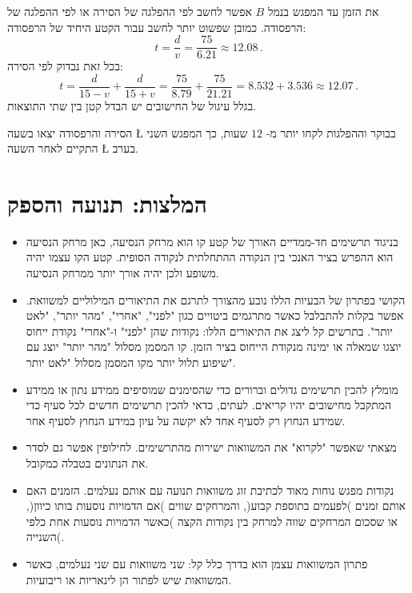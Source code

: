 \smallskip

את הזמן עד המפגש בנמל 
$B$
אפשר לחשב לפי ההפלגה של הסירה או לפי ההפלגה של הרפסודה. כמובן שפשוט יותר לחשב עבור הקטע היחיד של הרפסודה:
\[
t = \frac{d}{v} = \frac{75}{6.21} \approx 12.08\,.
\]
בכל זאת נבדוק לפי הסירה:
\[
t = \frac{d}{15-v} + \frac{d}{15+v} = \frac{75}{8.79} + \frac{75}{21.21}= 8.532 + 3.536 \approx 12.07\,.
\]
בגלל עיגול של החישובים יש הבדל קטן בין שתי התוצאות.

הסירה והרפסודה יצאו בשעה
\L{}
בבוקר וההפלגות לקחו יותר מ-%
$12$
שעות, כך המפגש השני התקיים לאחר השעה
\L{}
בערב.



\clearpage
{}


\section*{המלצות: תנועה והספק}


\begin{itemize}

\item
בניגוד תרשימים חד-ממדיים האורך של קטע קו הוא מרחק הנסיעה, כאן מרחק הנסיעה הוא ההפרש בציר האנכי בין הנקודה ההתחלתית לנקודה הסופית. קטע הקו עצמו יהיה משופע ולכן יהיה אורך יותר ממרחק הנסיעה.

\item
הקושי בפתרון של הבעיות הללו נובע מהצורך לתרגם את התיאורים המילוליים למשוואת. אפשר בקלות להתבלבל כאשר מתרגמים ביטויים כגון "לפני", "אחרי", "מהר יותר", "לאט יותר".  בתרשים קל ליצג את התיאורים הללו: נקודות שהן "לפני" ו-"אחרי" נקודת ייחוס יוצגו שמאלה או ימינה מנקודת הייחוס בציר הזמן. קו המסמן מסלול "מהר יותר" יוצג עם שיפוע תלול יותר מקו המסמן מסלול "לאט יותר".

\item
מומלץ להכין תרשימים גדולים וברורים כדי שהסימנים שמוסיפים ממידע נתון או ממידע המתקבל מחישובים יהיו קריאים. לעתים, כדאי להכין תרשימים חדשים לכל סעיף כדי שמידע הנחוץ רק לסעיף אחד לא יקשה על עיון במידע הנחוץ לסעיף אחר.

\item
מצאתי שאפשר "לקרוא" את המשוואות ישירות מהתרשימים. לחילופין אפשר גם לסדר את הנתונים בטבלה כמקובל.

\item 
נקודות מפגש נוחות מאוד לכתיבת זוג משוואות תנועה עם אותם נעלמים. הזמנים האם אותם זמנים )לפעמים בתוספת קבוע(, והמרחקים שווים )אם הדמויות נוסעות בותו כיוון(, או שסכום המרחקים שווה למרחק בין נקודות הקצה )כאשר הדמויות נוסעות אחת כלפי השנייה(.

\item 
פתרון המשוואות עצמן הוא בדרך כלל קל: שני משוואות עם שני נעלמים, כאשר המשוואות שיש לפתור הן לינאריות או ריבועיות.

\end{itemize}

\npchap
